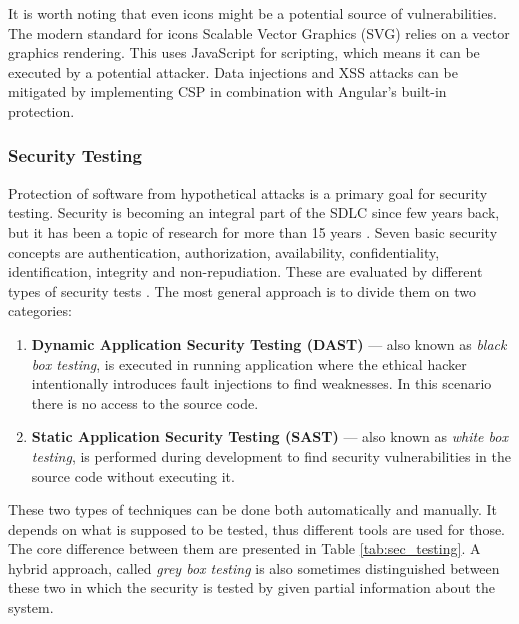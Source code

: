 \documentclass{article} %
\begin{document}
\newline
It is worth noting that even icons might be a potential source of vulnerabilities. The modern standard for icons Scalable Vector Graphics (SVG) relies on a vector graphics rendering. This uses JavaScript for scripting, which means it can be executed by a potential attacker. Data injections and XSS attacks can be mitigated by implementing CSP in combination with Angular's built-in protection.
\subsubsection{Security Testing}
\label{sec:security_testing}
Protection of software from hypothetical attacks is a primary goal for security testing. Security is becoming an integral part of the SDLC since few years back, but it has been a topic of research for more than 15 years \cite{bib:software_security_testing}. Seven basic security concepts are authentication, authorization, availability, confidentiality, identification, integrity and non-repudiation. These are evaluated by different types of security tests \cite{bib:dast_vs_sast}. The most general approach is to divide them on two categories:
\begin{enumerate}
    \item \textbf{Dynamic Application Security Testing (DAST)} --- also known as \textit{black box testing}, is executed in running application where the ethical hacker intentionally introduces fault injections to find weaknesses. In this scenario there is no access to the source code.
    \item \textbf{Static Application Security Testing (SAST)} --- also known as \textit{white box testing}, is performed during development to find security vulnerabilities in the source code without executing it.
\end{enumerate}
These two types of techniques can be done both automatically and manually. It depends on what is supposed to be tested, thus different tools are used for those. The core difference between them are presented in Table \ref{tab:sec_testing}. A hybrid approach, called \textit{grey box testing} is also sometimes distinguished between these two in which the security is tested by given partial information about the system.
\end{document}

